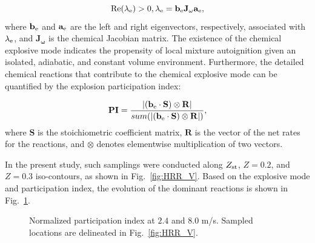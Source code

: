\documentclass[review,3p,times]{elsarticle}
\begin{document}
\begin{equation}
\rm{Re}(\lambda_{\rm e}) > 0, \lambda_{\rm e} = \mathbf{b_{\rm e}J_{\omega}a_{\rm e}},
\end{equation}
\textcolor{cm}{where $\mathbf{b_{\rm e}}$ and $\mathbf{a_{\rm e}}$ are the left and right eigenvectors, respectively, associated with $\lambda_{\rm e}$, and $\mathbf{J_{\omega}}$ is the chemical Jacobian matrix.  The existence of the chemical explosive mode indicates the propensity of local mixture autoignition given an isolated, adiabatic, and constant volume environment.  Furthermore, the detailed chemical reactions that contribute to the chemical explosive mode can be quantified by the explosion participation index:}

\begin{equation}
\mathbf{PI} = \frac{|(\mathbf{b_{\rm e}} \cdot \mathbf{S}) \otimes \mathbf{R}|}{sum(|(\mathbf{b_{\rm e}} \cdot \mathbf{S}) \otimes \mathbf{R}|)},
\end{equation}
\textcolor{cm}{where $\mathbf{S}$ is the stoichiometric coefficient matrix, $\mathbf{R}$ is the vector of the net rates for the reactions, and $\otimes$ denotes elementwise multiplication of two vectors.}  

In the present study, such samplings were conducted along $Z_{\rm st}$, $Z = 0.2$, and $Z = 0.3$ iso-contours, as shown in Fig.~\ref{fig:HRR_V}.  Based on the explosive mode and participation index, the evolution of the dominant reactions is shown in Fig.~\ref{fig:CEMA_V}.

\begin{figure}
  \centering
  \scriptsize
  \resizebox{1.0\textwidth}{!}{}
  \resizebox{1.0\textwidth}{!}{}
  \normalsize
  \caption{Normalized participation index at $2.4$ and $8.0$ m/s.  Sampled locations are delineated in Fig.~\ref{fig:HRR_V}.}
  \label{fig:CEMA_V}
\end{figure}
\end{document}
